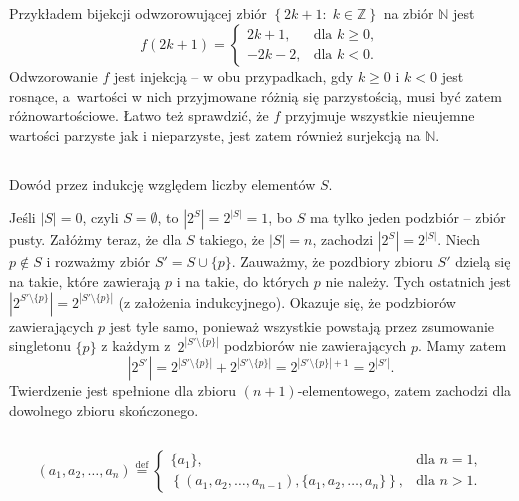 \subsection{} %
Przykładem bijekcji odwzorowującej zbiór $\left\{2k+1:\;k\in\mathbb{Z}\right\}$ na zbiór $\mathbb{N}$ jest
\[
	f(2k+1) = \left\{\begin{array}{ll}
		2k+1, & \mbox{dla }k\ge 0,\\
		-2k-2, & \mbox{dla }k<0.
	\end{array}\right.
\]
Odwzorowanie $f$ jest injekcją -- w obu przypadkach, gdy $k\ge 0$ i $k<0$ jest rosnące, a~wartości w nich przyjmowane różnią się parzystością, musi być zatem różnowartościowe. Łatwo też sprawdzić, że $f$ przyjmuje wszystkie nieujemne wartości parzyste jak i nieparzyste, jest zatem również surjekcją na $\mathbb{N}$.

\subsection{} %
Dowód przez indukcję względem liczby elementów $S$.

Jeśli $|S|=0$, czyli $S=\emptyset$, to $\left|2^S\right|=2^{|S|}=1$, bo $S$ ma tylko jeden podzbiór -- zbiór pusty.
Załóżmy teraz, że dla $S$ takiego, że $|S|=n$, zachodzi $\left|2^S\right|=2^{|S|}$. Niech $p\not\in S$ i rozważmy zbiór $S'=S\cup\{ p\}$. Zauważmy, że pozdbiory zbioru $S'$ dzielą się na takie, które zawierają $p$ i na takie, do których $p$ nie należy. Tych ostatnich jest $\left|2^{S'\setminus\{ p\}}\right|=2^{\left|S'\setminus\{ p\}\right|}$ (z założenia indukcyjnego). Okazuje się, że podzbiorów zawierających $p$ jest tyle samo, ponieważ wszystkie powstają przez zsumowanie singletonu $\{ p\}$ z każdym z~$2^{\left|S'\setminus\{ p\}\right|}$ podzbiorów nie zawierających $p$. Mamy zatem
\[
	\left|2^{S'}\right|=2^{\left|S'\setminus\{ p\}\right|}+2^{\left|S'\setminus\{ p\}\right|} = 2^{\left|S'\setminus\{ p\}\right|+1} = 2^{\left|S'\right|}.
\]
Twierdzenie jest spełnione dla zbioru $(n+1)$-elementowego, zatem zachodzi dla dowolnego zbioru skończonego.

\subsection{} %
\[
	(a_1,a_2,\dots,a_n)\stackrel{\mathrm{def}}{=}\left\{\begin{array}{ll}
		\{ a_1\}, & \mbox{dla } n=1,\\
		\left\{(a_1,a_2,\dots,a_{n-1}),\{ a_1,a_2,\dots,a_n\}\right\}, & \mbox{dla }n>1.
	\end{array}\right.
\]

